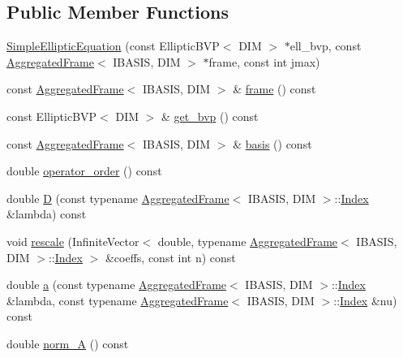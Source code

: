 \subsection*{Public Member Functions}
\begin{CompactItemize}
\item 
\hyperlink{classFrameTL_1_1SimpleEllipticEquation_d043ab2f1d2d62e13a2241ec148a10a2}{SimpleEllipticEquation} (const EllipticBVP$<$ DIM $>$ $\ast$ell\_\-bvp, const \hyperlink{classFrameTL_1_1AggregatedFrame}{AggregatedFrame}$<$ IBASIS, DIM $>$ $\ast$frame, const int jmax)
\item 
const \hyperlink{classFrameTL_1_1AggregatedFrame}{AggregatedFrame}$<$ IBASIS, DIM $>$ \& \hyperlink{classFrameTL_1_1SimpleEllipticEquation_21d88cf95981a8f5c3187c7339491b41}{frame} () const 
\item 
const EllipticBVP$<$ DIM $>$ \& \hyperlink{classFrameTL_1_1SimpleEllipticEquation_d1559772cff60c00487587b4a160a60f}{get\_\-bvp} () const 
\item 
const \hyperlink{classFrameTL_1_1AggregatedFrame}{AggregatedFrame}$<$ IBASIS, DIM $>$ \& \hyperlink{classFrameTL_1_1SimpleEllipticEquation_b0d14a3117004cec09cca7b665c962d0}{basis} () const 
\item 
double \hyperlink{classFrameTL_1_1SimpleEllipticEquation_b630525bc26c31fd7fd241c2d31fd4c8}{operator\_\-order} () const 
\item 
double \hyperlink{classFrameTL_1_1SimpleEllipticEquation_7fa64961d69cccd58143f6908eccb8b4}{D} (const typename \hyperlink{classFrameTL_1_1AggregatedFrame}{AggregatedFrame}$<$ IBASIS, DIM $>$::\hyperlink{classFrameTL_1_1FrameIndex}{Index} \&lambda) const 
\item 
void \hyperlink{classFrameTL_1_1SimpleEllipticEquation_df7e344f9567c74f5c6e34c3b6942937}{rescale} (InfiniteVector$<$ double, typename \hyperlink{classFrameTL_1_1AggregatedFrame}{AggregatedFrame}$<$ IBASIS, DIM $>$::\hyperlink{classFrameTL_1_1FrameIndex}{Index} $>$ \&coeffs, const int n) const 
\item 
double \hyperlink{classFrameTL_1_1SimpleEllipticEquation_472d73dad42588a253df3c51a8ed08c4}{a} (const typename \hyperlink{classFrameTL_1_1AggregatedFrame}{AggregatedFrame}$<$ IBASIS, DIM $>$::\hyperlink{classFrameTL_1_1FrameIndex}{Index} \&lambda, const typename \hyperlink{classFrameTL_1_1AggregatedFrame}{AggregatedFrame}$<$ IBASIS, DIM $>$::\hyperlink{classFrameTL_1_1FrameIndex}{Index} \&nu) const 
\item 
double \hyperlink{classFrameTL_1_1SimpleEllipticEquation_6d728f871244c8cb079e58eaca8c2402}{norm\_\-A} () const 

\end{CompactItemize}
